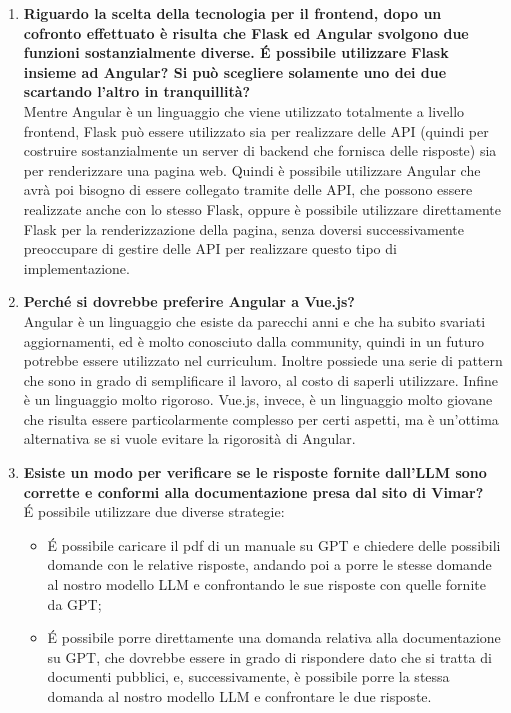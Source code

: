 \begin{enumerate}
    \begin{enumerate}[label=\Alph*)]
        \item \textbf{Riguardo la scelta della tecnologia per il frontend, dopo un cofronto effettuato è risulta che Flask ed Angular svolgono due funzioni sostanzialmente diverse. \'E possibile utilizzare Flask insieme ad Angular? Si può scegliere solamente uno dei due scartando l'altro in tranquillità?}\\
        Mentre Angular è un linguaggio che viene utilizzato totalmente a livello frontend, Flask può essere utilizzato sia per realizzare delle API (quindi per costruire sostanzialmente un server di backend che fornisca delle risposte) sia per renderizzare una pagina web. Quindi è possibile utilizzare Angular che avrà poi bisogno di essere collegato tramite delle API, che possono essere realizzate anche con lo stesso Flask, oppure è possibile utilizzare direttamente Flask per la renderizzazione della pagina, senza doversi successivamente preoccupare di gestire delle API per realizzare questo tipo di implementazione.
        \item \textbf{Perché si dovrebbe preferire Angular a Vue.js?}\\
        Angular è un linguaggio che esiste da parecchi anni e che ha subito svariati aggiornamenti, ed è molto conosciuto dalla community, quindi in un futuro potrebbe essere utilizzato nel curriculum. Inoltre possiede una serie di pattern che sono in grado di semplificare il lavoro, al costo di saperli utilizzare. Infine è un linguaggio molto rigoroso. Vue.js, invece, è un linguaggio molto giovane che risulta essere particolarmente complesso per certi aspetti, ma è un'ottima alternativa se si vuole evitare la rigorosità di Angular.
        \item \textbf{Esiste un modo per verificare se le risposte fornite dall'LLM sono corrette e conformi alla documentazione presa dal sito di Vimar?}\\
        \'E possibile utilizzare due diverse strategie:
        \begin{itemize}
            \item \'E possibile caricare il pdf di un manuale su GPT e chiedere delle possibili domande con le relative risposte, andando poi a porre le stesse domande al nostro modello LLM e confrontando le sue risposte con quelle fornite da GPT;
            \item \'E possibile porre direttamente una domanda relativa alla documentazione su GPT, che dovrebbe essere in grado di rispondere dato che si tratta di documenti pubblici, e, successivamente, è possibile porre la stessa domanda al nostro modello LLM e confrontare le due risposte.

\end{itemize}
\end{enumerate}
\end{enumerate}
